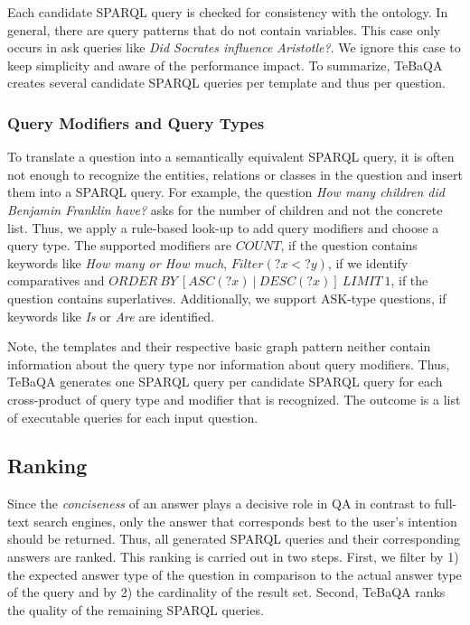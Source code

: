 \documentclass{IOS-Book-Article}
\begin{document}
Each candidate SPARQL query is checked for consistency with the ontology. In general, there are query patterns that do not contain variables. This case only occurs in ask queries like \textit{Did Socrates influence Aristotle?}. We ignore this case to keep simplicity and aware of the performance impact. To summarize, TeBaQA creates several candidate SPARQL queries per template and thus per question. 

\subsubsection{Query Modifiers and Query Types}
To translate a question into a semantically equivalent SPARQL query, it is often not enough to recognize the entities, relations or classes in the question and insert them into a SPARQL query. For example, the question \textit{How many children did Benjamin Franklin have?} asks for the number of children and not the concrete list.
Thus, we apply a rule-based look-up to add query modifiers and choose a query type. The supported modifiers are $COUNT$, if the question contains keywords like \textit{How many or How much}, $Filter (?x<?y)$, if we identify comparatives and $ORDER\: BY\: [ASC (?x)\:  |\: DESC (?x)]\: LIMIT \:1$, if the question contains superlatives. Additionally, we support ASK-type questions, if keywords like \textit{Is} or \textit{Are} are identified. 

Note, the templates and their respective basic graph pattern neither contain information about the query type nor information about query modifiers.
Thus, TeBaQA generates one SPARQL query per candidate SPARQL query for each cross-product of query type and modifier that is recognized.
The outcome is a list of executable queries for each input question.

\subsection{Ranking}
Since the \textit{conciseness} of an answer plays a decisive role in QA in contrast to full-text search engines, only the answer that corresponds best to the user's intention should be returned. 
Thus, all generated SPARQL queries and their corresponding answers are ranked.
This ranking is carried out in two steps. 
First, we filter by 1) the expected answer type of the question in comparison to the actual answer type of the query and by 2) the cardinality of the result set. Second, TeBaQA ranks the quality of the remaining SPARQL queries.
\end{document}
